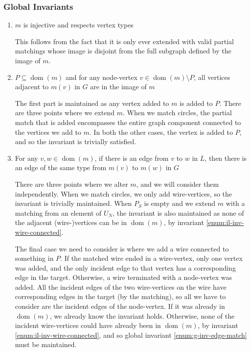 \documentclass{article}
\DeclareMathOperator{\dom}{dom}
\begin{document}
\subsubsection{Global Invariants}
\label{sec:il-global-inv}


\begin{enumerate}
  \renewcommand{\theenumi}{(\arabic{enumi})}
  \renewcommand{\labelenumi}{\theenumi}
  \item $m$ is injective and respects vertex types

  This follows from the fact that it is only ever extended with valid partial matchings whose image is disjoint from the full subgraph defined by the image of $m$.
  \item $P \subseteq \dom(m)$ and for any node-vertex $v \in \dom(m)\setminus P$, all vertices adjacent to $m(v)$ in $G$ are in the image of $m$

  The first part is maintained as any vertex added to $m$ is added to $P$.  There are three points where we extend $m$.  When we match circles, the partial match that is added encompasses the entire graph component connected to the vertices we add to $m$.  In both the other cases, the vertex is added to $P$, and so the invariant is trivially satisfied.

  \item For any $v,w \in \dom(m)$, if there is an edge from $v$ to $w$ in $L$, then there is an edge of the same type from $m(v)$ to $m(w)$ in $G$

  There are three points where we alter $m$, and we will consider them independently.  When we match circles, we only add wire-vertices, so the invariant is trivially maintained.  When $P_S$ is empty and we extend $m$ with a matching from an element of $U_N$, the invariant is also maintained as none of the adjacent (wire-)vertices can be in $\dom(m)$, by invariant \ref{enum:il-inv-wire-connected}.

The final case we need to consider is where we add a wire connected to something in $P$.  If the matched wire ended in a wire-vertex, only one vertex was added, and the only incident edge to that vertex has a corresponding edge in the target.  Otherwise, a wire terminated with a node-vertex was added.  All the incident edges of the two wire-vertices on the wire have corresponding edges in the target (by the matching), so all we have to consider are the incident edges of the node-vertex.  If it was already in $\dom(m)$, we already know the invariant holds.  Otherwise, none of the incident wire-vertices could have already been in $\dom(m)$, by invariant \ref{enum:il-inv-wire-connected}, and so global invariant \ref{enum:g-inv-edge-match} must be maintained.
\end{enumerate}
\end{document}
